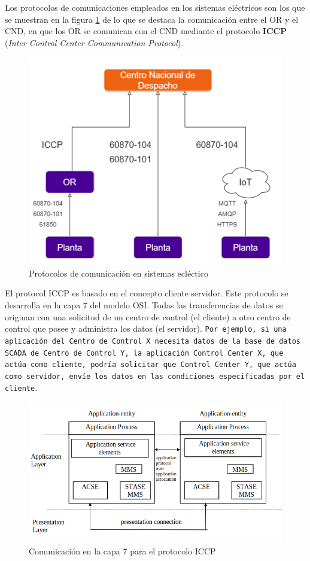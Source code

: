 \documentclass[a5paper]{book}%
\begin{document}
Los protocolos de comunicaciones empleados en los sistemas eléctricos son los que se muestran en la figura \ref{fig:protocoloscomunicacion} de lo que se destaca la comunicación entre el \ac{OR} y el \ac{CND}, en que los OR se comunican con el \ac{CND} mediante el protocolo \textbf{ICCP} (\textit{Inter Control Center Communication Protocol}).

\begin{figure}[H]
  \centering
  \caption{Protocolos de comunicación en sistemas ecléctico}
  \label{fig:protocoloscomunicacion}
  \includegraphics[width=0.5\linewidth]{protocolos_comunicacion}
\end{figure}

El protocol ICCP  es basado en el concepto cliente servidor. Este protocolo se desarrolla en la capa 7 del modelo OSI. Todas las transferencias de datos se originan con una solicitud de un centro de control (el cliente) a otro centro de control que posee y administra los datos (el servidor). \texttt{Por ejemplo, si una aplicación del Centro de Control X necesita datos de la base de datos SCADA de Centro de Control Y, la aplicación Control Center X, que actúa como cliente, podría solicitar que Control Center Y, que actúa como servidor, envíe los datos en las condiciones especificadas por el cliente}.\\

\begin{figure}[H]
  \caption{Comunicación en la capa 7 para el protocolo ICCP}
  \label{fig:capa7iccp}
  \includegraphics[width=\linewidth]{capas_iccp}
\end{figure}
\end{document}
